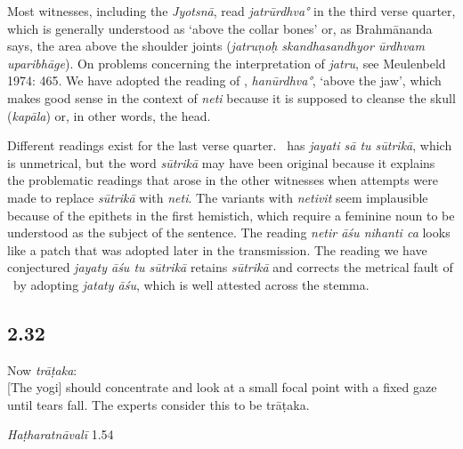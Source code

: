 \begin{ekdosis}
\begin{philcomm}[hp02_031]
Most witnesses, including the \emph{Jyotsnā}, read \emph{jatrūrdhva°} in the third verse quarter, which is generally understood as `above the collar bones' or, as Brahmānanda says, the area above the shoulder joints (\emph{jatruṇoḥ skandhasandhyor ūrdhvam uparibhāge}). On problems concerning the interpretation of \emph{jatru}, see Meulenbeld 1974: 465. We have adopted the reading of \textalpha, \emph{hanūrdhva°}, ‘above the jaw’, which makes good sense in the context of \emph{neti} because it is supposed to cleanse the skull (\emph{kapāla}) or, in other words, the head.

Different readings exist for the last verse quarter. \etaOne\ has \emph{jayati sā tu sūtrikā}, which is unmetrical, but the word \emph{sūtrikā} may have been original because it explains the problematic readings that arose in the other witnesses when attempts were made to replace \emph{sūtrikā} with \emph{neti}. The variants with \emph{netivit} seem implausible because of the epithets in the first hemistich, which require a feminine noun to be understood as the subject of the sentence. The reading \emph{netir āśu nihanti ca} looks like a patch that was adopted later in the transmission. The reading we have conjectured \emph{jayaty āśu tu sūtrikā} retains \emph{sūtrikā} and corrects the metrical fault of \etaOne\ by adopting \emph{jataty āśu}, which is well attested across the stemma.
\end{philcomm}

\subsection*{2.32}
\begin{translation}[hp02_032]
Now \emph{trāṭaka}:\\
{}[The yogi] should concentrate and look at a small focal point with a fixed gaze until tears fall. The experts consider this to be trāṭaka.
\end{translation}


\begin{testimonia}[hp02_032]
\emph{Haṭharatnāvalī} 1.54

\begin{versinnote}
\end{versinnote}


\end{testimonia}
\end{ekdosis}
